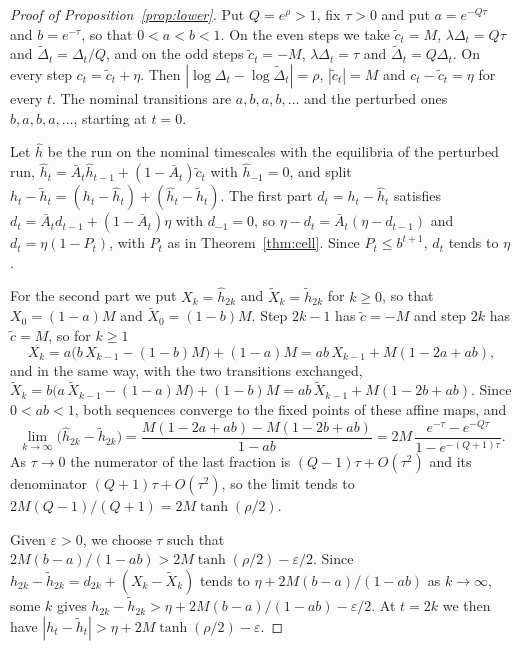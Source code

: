 \documentclass[11pt, a4paper]{article}
\theoremstyle{remark}
\theoremstyle{plain}
\newcommand{\Abar}{\bar{A}}
\begin{document}
\begin{proof}[Proof of Proposition~\ref{prop:lower}]
Put $Q = e^{\rho} > 1$, fix $\tau > 0$ and put $a = e^{-Q\tau}$ and $b = e^{-\tau}$, so that
$0 < a < b < 1$. On the even steps we take $\tilde c_t = M$, $\lambda\Delta_t = Q\tau$ and
$\tilde\Delta_t = \Delta_t/Q$, and on the odd steps $\tilde c_t = -M$, $\lambda\Delta_t = \tau$
and $\tilde\Delta_t = Q\Delta_t$. On every step $c_t = \tilde c_t + \eta$. Then
$|\log\Delta_t - \log\tilde\Delta_t| = \rho$, $|\tilde c_t| = M$ and $c_t - \tilde c_t = \eta$
for every $t$. The nominal transitions are $a, b, a, b, \dots$ and the perturbed ones
$b, a, b, a, \dots$, starting at $t = 0$.

Let $\hat h$ be the run on the nominal timescales with the equilibria of the perturbed run,
$\hat h_t = \Abar_t\hat h_{t-1} + (1 - \Abar_t)\tilde c_t$ with $\hat h_{-1} = 0$, and split
$h_t - \tilde h_t = (h_t - \hat h_t) + (\hat h_t - \tilde h_t)$. The first part
$d_t = h_t - \hat h_t$ satisfies $d_t = \Abar_t d_{t-1} + (1 - \Abar_t)\eta$ with $d_{-1} = 0$,
so $\eta - d_t = \Abar_t(\eta - d_{t-1})$ and $d_t = \eta(1 - P_t)$, with $P_t$ as in
Theorem~\ref{thm:cell}. Since $P_t \le b^{t+1}$, $d_t$ tends to $\eta$.

For the second part we put $X_k = \hat h_{2k}$ and $\tilde X_k = \tilde h_{2k}$ for $k \ge 0$, so
that $X_0 = (1 - a)M$ and $\tilde X_0 = (1 - b)M$. Step $2k - 1$ has $\tilde c = -M$ and step $2k$
has $\tilde c = M$, so for $k \ge 1$
\[
  X_k = a\bigl(b\, X_{k-1} - (1 - b)M\bigr) + (1 - a)M = ab\, X_{k-1} + M(1 - 2a + ab),
\]
and in the same way, with the two transitions exchanged,
$\tilde X_k = b\bigl(a\, \tilde X_{k-1} - (1 - a)M\bigr) + (1 - b)M = ab\, \tilde X_{k-1} + M(1 - 2b + ab)$. Since
$0 < ab < 1$, both sequences converge to the fixed points of these affine maps, and
\[
  \lim_{k \to \infty} \bigl(\hat h_{2k} - \tilde h_{2k}\bigr)
    = \frac{M(1 - 2a + ab) - M(1 - 2b + ab)}{1 - ab}
    = 2M\,\frac{e^{-\tau} - e^{-Q\tau}}{1 - e^{-(Q + 1)\tau}} .
\]
As $\tau \to 0$ the numerator of the last fraction is $(Q - 1)\tau + O(\tau^2)$ and its
denominator $(Q + 1)\tau + O(\tau^2)$, so the limit tends to
$2M(Q - 1)/(Q + 1) = 2M\tanh(\rho/2)$.

Given $\varepsilon > 0$, we choose $\tau$ such that $2M(b - a)/(1 - ab) > 2M\tanh(\rho/2) -
\varepsilon/2$. Since $h_{2k} - \tilde h_{2k} = d_{2k} + (X_k - \tilde X_k)$ tends to
$\eta + 2M(b - a)/(1 - ab)$ as $k \to \infty$, some $k$ gives
$h_{2k} - \tilde h_{2k} > \eta + 2M(b - a)/(1 - ab) - \varepsilon/2$. At $t = 2k$ we then have
$|h_t - \tilde h_t| > \eta + 2M\tanh(\rho/2) - \varepsilon$.
\end{proof}
\end{document}
